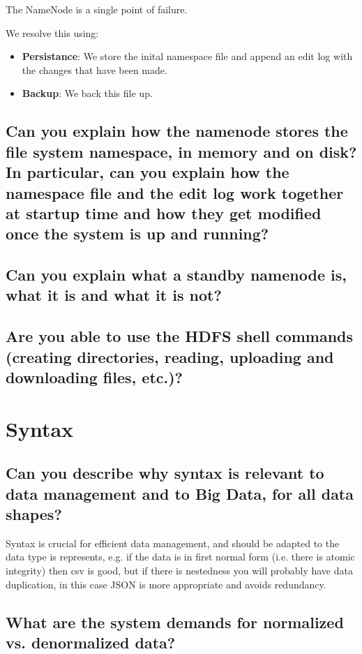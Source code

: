 \documentclass{article}
\begin{document}
The NameNode is a single point of failure.

We resolve this using:

\begin{itemize}
    \item \textbf{Persistance}: We store the inital namespace file and append an edit log with the changes that have been made.
    \item \textbf{Backup}: We back this file up.
\end{itemize}


\subsection{Can you explain how the namenode stores the file system namespace, in memory and on disk? In particular, can you explain how the namespace file and the edit log work together at startup time and how they get modified once the system is up and running?}
\subsection{Can you explain what a standby namenode is, what it is and what it is not?}
\subsection{Are you able to use the HDFS shell commands (creating directories, reading, uploading and downloading files, etc.)?}



\section{Syntax}
\subsection{Can you describe why syntax is relevant to data management and to Big Data, for all data shapes?}

Syntax is crucial for efficient data management, and should be adapted to the data type is represents, e.g. if the data is in first normal form (i.e. there is atomic integrity) then csv is good, but if there is nestedness you will probably have data duplication, in this case JSON is more appropriate and avoids redundancy.

\subsection{What are the system demands for normalized vs. denormalized data?}
\end{document}
